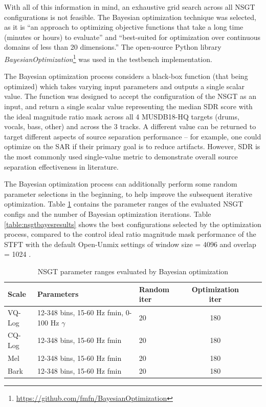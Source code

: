 \documentclass[letter,12pt,notitlepage]{article}
\begin{document}
With all of this information in mind, an exhaustive grid search across all NSGT configurations is not feasible. The Bayesian optimization technique \cite{bayesian} was selected, as it is ``an approach to optimizing objective functions that take a long time (minutes or hours) to evaluate'' and ``best-suited for optimization over continuous domains of less than 20 dimensions.'' The open-source Python library \textit{BayesianOptimization}\footnote{\href{https://github.com/fmfn/BayesianOptimization}{https://github.com/fmfn/BayesianOptimization}} was used in the testbench implementation.

The Bayesian optimization process considers a black-box function (that being optimized) which takes varying input parameters and outputs a single scalar value. The function was designed to accept the configuration of the NSGT as an input, and return a single scalar value representing the median SDR score with the ideal magnitude ratio mask across all 4 MUSDB18-HQ targets (drums, vocals, bass, other) and across the 3 tracks. A different value can be returned to target different aspects of source separation performance -- for example, one could optimize on the SAR if their primary goal is to reduce artifacts. However, SDR is the most commonly used single-value metric to demonstrate overall source separation effectiveness in literature.

The Bayesian optimization process can additionally perform some random parameter selections in the beginning, to help improve the subsequent iterative optimization. Table \ref{table:nsgtparamsirm} contains the parameter ranges of the evaluated NSGT configs and the number of Bayesian optimization iterations. Table \ref{table:nsgtbayesresults} shows the best configurations selected by the optimization process, compared to the control ideal ratio magnitude mask performance of the STFT with the default Open-Unmix settings of window size = 4096 and overlap = 1024 \cite{umx}.

\begin{table}[ht]
	\centering
\begin{tabular}{ |l|l|l|c|c|c| }
	 \hline
	  Scale & Parameters & Random iter & Optimization iter \\
	 \hline
	 \hline
	 VQ-Log & 12-348 bins, 15-60 Hz fmin, 0-100 Hz $\gamma$ & 20 & 180 \\
	 \hline
	 CQ-Log & 12-348 bins, 15-60 Hz fmin & 20 & 180 \\
	 \hline
	 Mel & 12-348 bins, 15-60 Hz fmin & 20 & 180 \\
	 \hline
	 Bark & 12-348 bins, 15-60 Hz fmin & 20 & 180 \\
	 \hline
\end{tabular}
	\caption{NSGT parameter ranges evaluated by Bayesian optimization}
	\label{table:nsgtparamsirm}
\end{table}
\end{document}
